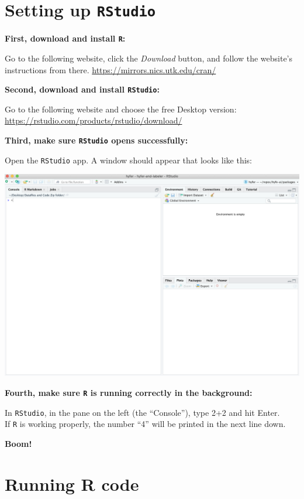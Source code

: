 \documentclass[
]{book}
\begin{document}
\hypertarget{setting-up-rstudio}{%
\chapter{\texorpdfstring{Setting up \texttt{RStudio}}{Setting up RStudio}}\label{setting-up-rstudio}}

\textbf{First, download and install \texttt{R}: }

Go to the following website, click the \emph{Download} button, and follow the website's instructions from there.
\url{https://mirrors.nics.utk.edu/cran/}

\textbf{Second, download and install \texttt{RStudio}:}

Go to the following website and choose the free Desktop version:
\url{https://rstudio.com/products/rstudio/download/}

\textbf{Third, make sure \texttt{RStudio} opens successfully:}

Open the \texttt{RStudio} app. A window should appear that looks like this:

\includegraphics{img/rstudio_firstopen.png}

\textbf{Fourth, make sure \texttt{R} is running correctly in the background:}

In \texttt{RStudio}, in the pane on the left (the ``Console''), type 2+2 and hit Enter.\\
If \texttt{R} is working properly, the number ``4'' will be printed in the next line down.

\textbf{Boom!}

\hypertarget{running-r-code}{%
\chapter{Running R code}\label{running-r-code}}
\end{document}
